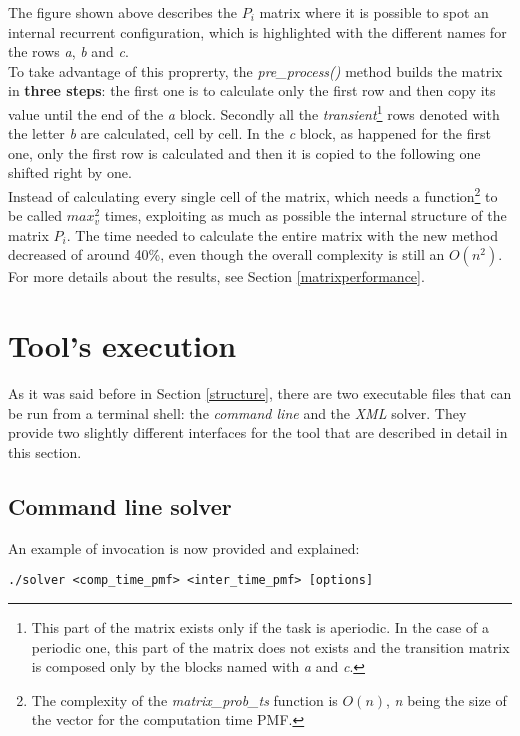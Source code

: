 The figure shown above describes the \( P_{i} \) matrix where it is possible to spot an internal recurrent configuration, which is highlighted with the different names for the rows \emph{a}, \emph{b} and \emph{c}.\\
To take advantage of this proprerty, the \emph{pre\_process()} method builds the matrix in \textbf{three steps}: the first one is to calculate only the first row and then copy its value until the end of the \emph{a} block. Secondly all the \emph{transient}\footnote{This part of the matrix exists only if the task is aperiodic. In the case of a periodic one, this part of the matrix does not exists and the transition matrix is composed only by the blocks named with \emph{a} and \emph{c}.} rows denoted with the letter \emph{b} are calculated, cell by cell. In the \emph{c} block, as happened for the first one, only the first row is calculated and then it is copied to the following one shifted right by one.\\
Instead of calculating every single cell of the matrix, which needs a function\footnote{The complexity of the \emph{matrix\_prob\_ts} function is \( O(n) \), \emph{n} being the size of the vector for the computation time PMF.} to be called \( max_{v}^{2} \) times, exploiting as much as possible the internal structure of the matrix \( P_{i} \). The time needed to calculate the entire matrix with the new method decreased of around 40\%, even though the overall complexity is still an \( O(n^{2}) \). For more details about the results, see Section \ref{matrixperformance}.

\section{Tool's execution}
As it was said before in Section \ref{structure}, there are two executable files that can be run from a terminal shell: the \emph{command line} and the \emph{XML} solver. They provide two slightly different interfaces for the tool that are described in detail in this section.

\subsection{Command line solver}
An example of invocation is now provided and explained:
\begin{lstlisting}[frame=bt, numbers=none]
  ./solver <comp_time_pmf> <inter_time_pmf> [options]
\end{lstlisting}    

